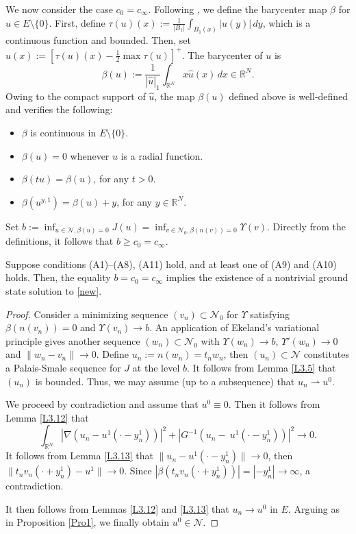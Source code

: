 \documentclass[reqno]{amsart}
\begin{document}
We now consider the case \( c_0 = c_\infty \). Following \cite{Ambrosetti, Cerami}, 
we define the barycenter map \( \beta \) for  \( u \in E\setminus\{0\} \). 
First, define \( \tau(u)(x) := \frac{1}{|B_1|} \int_{B_1(x)} |u(y)| \, dy \), which is a continuous 
function and bounded. Then, set \( \hat{u}(x) := \left[ \tau(u)(x) - \frac{1}{2} \max \tau(u) \right]^+\).
 The barycenter of \( u \) is 
 \[
\beta(u) := \frac{1}{|\hat{u}|_1} \int_{\mathbb{R}^N} x \hat{u}(x) \, dx \in \mathbb{R}^N.
 \]
Owing to the compact support of $\hat{u}$,  the map $\beta(u)$ defined above is well-defined 
and verifies the following:
\begin{itemize}
\item[(1)] $\beta$ is continuous in $ E\setminus\{0\}$.
\item[(2)] $\beta(u)=0$ whenever $u$ is a radial function.
\item[(3)] $\beta(t u) = \beta(u)$, for any $t > 0$.
\item[(4)] $\beta(u^{y,1})=\beta(u)+y$, for any  $y\in{\mathbb{R}^N}$.
\end{itemize}
Set $b:=\inf_{u\in\mathcal{N},\beta(u)=0}J(u)=\inf_{v\in \mathcal{N}_0,\beta(n(v))=0}\Upsilon (v)$. Directly from the definitions, it follows that  $b\geq c_0=c_\infty$.

\begin{proposition} \label{Pro2} 
Suppose conditions  {\rm (A1)--(A8), (A11) } hold, and at least one of {\rm (A9) }and {\rm (A10) }
 holds. Then,  the equality $b=c_0=c_\infty$ implies the existence of a nontrivial ground state solution to \eqref{new}.
\end{proposition}

\begin{proof}
Consider a minimizing sequence $(v_n)\subset \mathcal{N}_0$  for $\Upsilon$ satisfying 
$\beta(n(v_n))=0$ and $\Upsilon(v_n)\to b$. An application of Ekeland’s variational principle 
gives another sequence  $(w_n)\subset \mathcal{N}_0$ with $\Upsilon(w_n)\to b$, 
$\Upsilon'(w_n)\to 0$ and $\|w_n-v_n\|\to0$. Define $u_n:=n(w_n)=t_nw_n$, then 
$(u_n)\subset\mathcal{N}$ constitutes a Palais-Smale sequence for $J$ at the level $b$. 
It follows from Lemma \ref{L3.5} that \( (u_n) \) is bounded. Thus, we may assume (up to a subsequence) that \( u_n \rightharpoonup u^0 \).

We proceed by contradiction and assume that \( u^0 \equiv 0 \). 
Then it follows from Lemma \ref{L3.12} that
$$
\int_{\mathbb{R}^N} \left|\nabla \left(u_n  -  u^1(\cdot - y_n^1)\right)\right|^2 
+ \left|G^{-1}\left(u_n  - \ u^1(\cdot - y_n^1)\right)\right|^2\to 0.
$$
It follows from Lemma \ref{L3.13}  that $\|u_n-u^1(\cdot-y_n^1)\|\to0$, then 
$\|t_nv_n(\cdot+y_n^1)-u^1\|\to0$. Since $|\beta(t_nv_n(\cdot+y_n^1))|=|-y_n^1|\to\infty$, 
a contradiction.

It then follows from Lemmas \ref{L3.12} and \ref{L3.13} that \( u_n \to u^0 \) in \( E \). 
Arguing as in Proposition \ref{Pro1}, we finally obtain $u^0\in\mathcal{N}$.
\end{proof}
\end{document}
